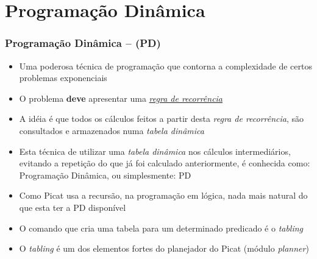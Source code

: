 
       
       \section{Programação Dinâmica}
\begin{frame}[fragile]

    \frametitle{Programação Dinâmica -- (PD)}

   \begin{block}{}
     \begin{itemize}
      \item Uma poderosa técnica de programação que  contorna a complexidade de certos problemas
      exponenciais
      
       \pause
       \item O problema \textbf{deve} apresentar uma \textit{\underline{regra de recorrência}}
       
      \pause
      \item A idéia é que todos os cálculos feitos a partir desta \textit{regra de recorrência},
      são consultados e armazenados numa \textit{tabela dinâmica}
      
      \pause
      \item Esta técnica de utilizar uma \textit{tabela dinâmica} nos cálculos intermediários,
      evitando a repetição do que já foi calculado anteriormente, é conhecida como:
      Programação Dinâmica, ou simplesmente: PD

      \pause
      \item Como Picat usa a recursão, na programação em lógica, nada mais
      natural do que esta ter a PD disponível 

       \pause
       \item O comando que cria uma tabela para um determinado predicado é o  \textit{tabling}
 
        \pause
       \item O \textit{tabling}  é um dos elementos fortes do planejador do Picat (módulo \textit{planner})

    \end{itemize}
    
    \end{block}
    
\end{frame}



